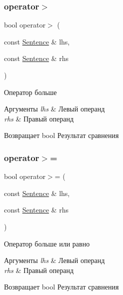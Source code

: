 \subsubsection{\texorpdfstring{operator$>$}{operator>}}
{\footnotesize\ttfamily bool operator$>$ (\begin{DoxyParamCaption}\item[{const \hyperlink{classJarvis_1_1Sentence}{Sentence} \&}]{lhs,  }\item[{const \hyperlink{classJarvis_1_1Sentence}{Sentence} \&}]{rhs }\end{DoxyParamCaption})\hspace{0.3cm}{\ttfamily [friend]}}



Оператор больше 


\begin{DoxyParams}{Аргументы}
{\em lhs} & Левый операнд \\
\hline
{\em rhs} & Правый операнд \\
\hline
\end{DoxyParams}
\begin{DoxyReturn}{Возвращает}
bool Результат сравнения 
\end{DoxyReturn}
\mbox{\label{classJarvis_1_1Sentence_a4e0a564a452ba4172bd0d718c04ea7e0}} 
\subsubsection{\texorpdfstring{operator$>$=}{operator>=}}
{\footnotesize\ttfamily bool operator$>$= (\begin{DoxyParamCaption}\item[{const \hyperlink{classJarvis_1_1Sentence}{Sentence} \&}]{lhs,  }\item[{const \hyperlink{classJarvis_1_1Sentence}{Sentence} \&}]{rhs }\end{DoxyParamCaption})\hspace{0.3cm}{\ttfamily [friend]}}



Оператор больше или равно 


\begin{DoxyParams}{Аргументы}
{\em lhs} & Левый операнд \\
\hline
{\em rhs} & Правый операнд \\
\hline
\end{DoxyParams}
\begin{DoxyReturn}{Возвращает}
bool Результат сравнения 
\end{DoxyReturn}


